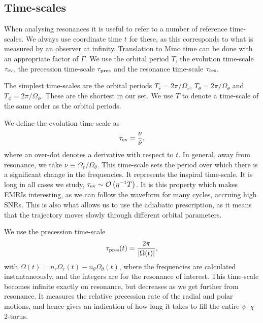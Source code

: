 \subsection{Time-scales}\label{sec:res-time}

When analysing resonances it is useful to refer to a number of reference time-scales. We always use coordinate time $t$ for these, as this corresponds to what is measured by an observer at infinity. Translation to Mino time can be done with an appropriate factor of $\Gamma$. We use the orbital period $T$, the evolution time-scale $\tau_\mathrm{ev}$, the precession time-scale $\tau_\mathrm{pres}$ and the resonance time-scale $\tau_\mathrm{res}$.

The simplest time-scales are the orbital periods $T_r = 2\pi/\Omega_r$, $T_\theta = 2\pi/\Omega_\theta$ and $T_\phi = 2\pi/\Omega_\phi$. These are the shortest in our set. We use $T$ to denote a time-scale of the same order as the orbital periods.

We define the evolution time-scale as
\begin{equation}
\tau_\mathrm{ev} = \dfrac{\nu}{\dot{\nu}},
\end{equation}
where an over-dot denotes a derivative with respect to $t$. In general, away from resonance, we take $\nu \equiv \Omega_r/\Omega_\theta$. This time-scale sets the period over which there is a significant change in the frequencies. It represents the inspiral time-scale. It is long in all cases we study, $\tau_\mathrm{ev} \sim \mathcal{O}\left({\eta^{-1}T}\right)$. It is this property which makes EMRIs interesting, as we can follow the waveform for many cycles, accruing high SNRs. This is also what allows us to use the adiabatic prescription, as it means that the trajectory moves slowly through different orbital parameters.

We use the precession time-scale
\begin{equation}
\tau_\mathrm{pres}(t) = \dfrac{2\pi}{|\Omega(t)|},
\label{eq:t-pres}
\end{equation}
with $\Omega(t) = n_r \Omega_r(t) - n_\theta \Omega_\theta(t)$, where the frequencies are calculated instantaneously, and the integers are for the resonance of interest. This time-scale becomes infinite exactly on resonance, but decreases as we get further from resonance. It measures the relative precession rate of the radial and polar motions, and hence gives an indication of how long it takes to fill the entire $\psi$--$\chi$ $2$-torus.

